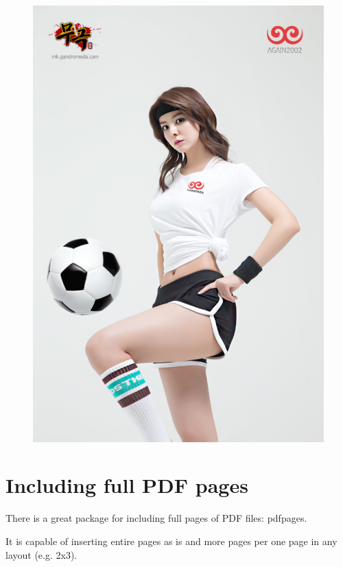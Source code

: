 		
			\clearpage
			\begin{figure}
			\centering
			\includegraphics[page=1,scale=0.5]{./fig/8.pdf}
			\end{figure}
			\clearpage
	
\newpage
\section{Including full PDF pages}

	There is a great package for including full pages of PDF files: pdfpages. \par
	It is capable of inserting entire pages as is and more pages per one page in any layout (e.g. 2x3).

